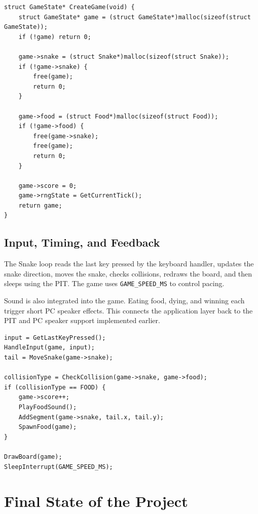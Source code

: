 \begin{listing}[H]
\begin{verbatim}
struct GameState* CreateGame(void) {
    struct GameState* game = (struct GameState*)malloc(sizeof(struct GameState));
    if (!game) return 0;

    game->snake = (struct Snake*)malloc(sizeof(struct Snake));
    if (!game->snake) {
        free(game);
        return 0;
    }

    game->food = (struct Food*)malloc(sizeof(struct Food));
    if (!game->food) {
        free(game->snake);
        free(game);
        return 0;
    }

    game->score = 0;
    game->rngState = GetCurrentTick();
    return game;
}
\end{verbatim}
\caption{Snake creates its game objects using the kernel heap allocator.}
\end{listing}
\clearpage

\subsection{Input, Timing, and Feedback}
The Snake loop reads the last key pressed by the keyboard handler, updates the snake direction, moves the snake, checks collisions, redraws the board, and then sleeps using the PIT. The game uses \texttt{GAME\_SPEED\_MS} to control pacing.

Sound is also integrated into the game. Eating food, dying, and winning each trigger short PC speaker effects. This connects the application layer back to the PIT and PC speaker support implemented earlier.

\begin{listing}[H]
\begin{verbatim}
input = GetLastKeyPressed();
HandleInput(game, input);
tail = MoveSnake(game->snake);

collisionType = CheckCollision(game->snake, game->food);
if (collisionType == FOOD) {
    game->score++;
    PlayFoodSound();
    AddSegment(game->snake, tail.x, tail.y);
    SpawnFood(game);
}

DrawBoard(game);
SleepInterrupt(GAME_SPEED_MS);
\end{verbatim}
\caption{Main Snake loop combining keyboard input, game state, sound, drawing, and PIT timing.}
\end{listing}
\clearpage

\section{Final State of the Project}


